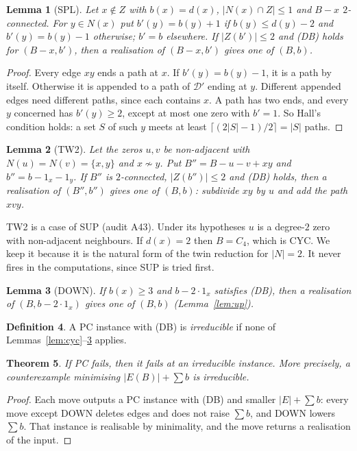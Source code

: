 \documentclass[11pt]{amsart}
\newtheorem{theorem}{Theorem}[section]
\newtheorem{lemma}[theorem]{Lemma}
\theoremstyle{definition}
\newtheorem{definition}[theorem]{Definition}
\begin{document}
\begin{lemma}[SPL]\label{lem:spl}
Let $x\notin Z$ with $b(x)=d(x)$, $|N(x)\cap Z|\le1$ and $B-x$ $2$-connected. For $y\in N(x)$ put
$b'(y)=b(y)+1$ if $b(y)\le d(y)-2$ and $b'(y)=b(y)-1$ otherwise; $b'=b$ elsewhere. If $|Z(b')|\le2$ and
(DB) holds for $(B-x,b')$, then a realisation of $(B-x,b')$ gives one of $(B,b)$.
\end{lemma}
\begin{proof}
Every edge $xy$ ends a path at $x$. If $b'(y)=b(y)-1$, it is a path by itself. Otherwise it is appended to
a path of $\mathcal D'$ ending at $y$. Different appended edges need different paths, since each contains $x$. A
path has two ends, and every $y$ concerned has $b'(y)\ge2$, except at most one zero with $b'=1$. So Hall's
condition holds: a set $S$ of such $y$ meets at least $\lceil(2|S|-1)/2\rceil=|S|$ paths.
\end{proof}

\begin{lemma}[TW2]\label{lem:tw2}
Let the zeros $u,v$ be non-adjacent with $N(u)=N(v)=\{x,y\}$ and $x\not\sim y$. Put
$B''=B-u-v+xy$ and $b''=b-1_x-1_y$. If $B''$ is $2$-connected, $|Z(b'')|\le2$ and (DB) holds, then a
realisation of $(B'',b'')$ gives one of $(B,b)$: subdivide $xy$ by $u$ and add the path $xvy$.
\end{lemma}

TW2 is a case of SUP (audit A43). Under its hypotheses $u$ is a degree-$2$ zero with non-adjacent
neighbours. If $d(x)=2$ then $B=C_4$, which is CYC. We keep it because it is the natural form of the
twin reduction for $|N|=2$. It never fires in the computations, since SUP is tried first.

\begin{lemma}[DOWN]\label{lem:down}
If $b(x)\ge3$ and $b-2\cdot1_x$ satisfies (DB), then a realisation of $(B,b-2\cdot1_x)$ gives one of
$(B,b)$ (Lemma~\ref{lem:up}).
\end{lemma}

\begin{definition}
A PC instance with (DB) is \emph{irreducible} if none of Lemmas~\ref{lem:cyc}--\ref{lem:down} applies.
\end{definition}

\begin{theorem}\label{thm:irred}
If PC fails, then it fails at an irreducible instance. More precisely, a counterexample minimising
$|E(B)|+\sum b$ is irreducible.
\end{theorem}
\begin{proof}
Each move outputs a PC instance with (DB) and smaller $|E|+\sum b$: every move except DOWN deletes edges
and does not raise $\sum b$, and DOWN lowers $\sum b$. That instance is realisable by minimality, and the
move returns a realisation of the input.
\end{proof}
\end{document}

